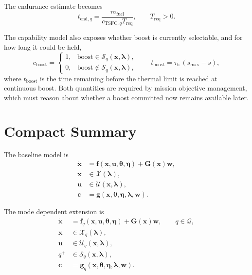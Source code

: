 \documentclass[11pt,a4paper]{article}
\newcommand{\Xset}{\mathcal{X}}
\newcommand{\Uset}{\mathcal{U}}
\newcommand{\Qset}{\mathcal{Q}}
\newcommand{\Sset}{\mathcal{S}}
\newcommand{\vecx}{\bm{x}}
\newcommand{\vecu}{\bm{u}}
\newcommand{\vecw}{\bm{w}}
\newcommand{\vecc}{\bm{c}}
\newcommand{\vectheta}{\bm{\theta}}
\newcommand{\veceta}{\bm{\eta}}
\newcommand{\veclambda}{\bm{\lambda}}
\newcommand{\vecf}{\bm{f}}
\newcommand{\vecg}{\bm{g}}
\newcommand{\matG}{\bm{G}}
\begin{document}
The endurance estimate becomes
\begin{equation}
  t_{\mathrm{end},q} =
  \frac{m_{\mathrm{fuel}}}{c_{\mathrm{TSFC},q} T_{\mathrm{req}}},
  \qquad T_{\mathrm{req}} > 0 .
\end{equation}

The capability model also exposes whether boost is currently selectable, and for
how long it could be held,
\begin{equation}
  c_{\mathrm{boost}} =
  \begin{cases}
    1, & \mathrm{boost} \in \Sset_q(\vecx, \veclambda), \\
    0, & \mathrm{boost} \notin \Sset_q(\vecx, \veclambda),
  \end{cases}
  \qquad
  t_{\mathrm{boost}} = \tau_{\mathrm{h}}\,(s_{\max} - s),
  \label{eq:boost-available}
\end{equation}
where $t_{\mathrm{boost}}$ is the time remaining before the thermal limit is
reached at continuous boost. Both quantities are required by mission objective
management, which must reason about whether a boost committed now remains
available later.

\section{Compact Summary}

The baseline model is
\begin{equation}
  \begin{aligned}
    \dot{\vecx} &= \vecf(\vecx, \vecu, \vectheta, \veceta) + \matG(\vecx)\vecw, \\
    \vecx &\in \Xset(\veclambda), \\
    \vecu &\in \Uset(\vecx, \veclambda), \\
    \vecc &= \vecg(\vecx, \vectheta, \veceta, \veclambda, \vecw).
  \end{aligned}
\end{equation}

The mode dependent extension is
\begin{equation}
  \begin{aligned}
    \dot{\vecx} &= \vecf_q(\vecx, \vecu, \vectheta, \veceta) + \matG(\vecx)\vecw,
      \qquad q \in \Qset, \\
    \vecx &\in \Xset_q(\veclambda), \\
    \vecu &\in \Uset_q(\vecx, \veclambda), \\
    q^{+} &\in \Sset_q(\vecx, \veclambda), \\
    \vecc &= \vecg_q(\vecx, \vectheta, \veceta, \veclambda, \vecw).
  \end{aligned}
\end{equation}
\end{document}
